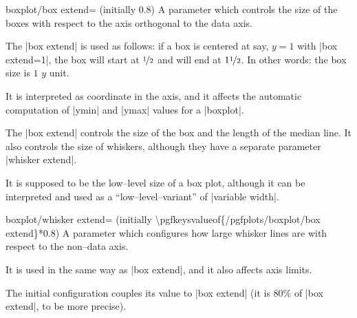\begin{pgfplotskey}{boxplot/box extend= (initially 0.8)}
	A parameter which controls the size of the boxes with respect to the axis orthogonal to the data axis. 

	The |box extend| is used as follows: if a box is centered at say, $y=1$ with |box extend=1|, the box will start at $\nicefrac12$ and will end at $1 \nicefrac 12$. In other words: the box size is $1$ $y$ unit.

	It is interpreted as coordinate in the axis, and it affects the automatic computation of |ymin| and |ymax| values for a |boxplot|.
\begin{codeexample}[]
\end{codeexample}

	The |box extend| controls the size of the box and the length of the median line. It also controls the size of whiskers, although they have a separate parameter |whisker extend|.

	It is supposed to be the low--level size of a box plot, although it can be interpreted and used as a ``low--level--variant'' of |variable width|.
	
\end{pgfplotskey}

\begin{pgfplotskey}{boxplot/whisker extend= (initially \textbackslash pgfkeysvalueof\{/pgfplots/boxplot/box extend\}*0.8)}
	A parameter which configures how large whisker lines are with respect to the non--data axis.
	
	It is used in the same way as |box extend|, and it also affects axis limits. 

	The initial configuration couples its value to |box extend| (it is $80\%$ of |box extend|, to be more precise).
\end{pgfplotskey}


